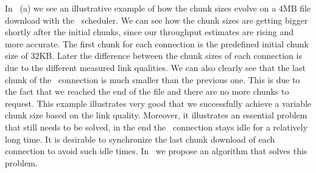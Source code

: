 In~ (a) we see an illustrative example of how the chunk sizes evolve on a $4$MB file download with the \algalpha~scheduler. 
We can see how the chunk sizes are getting bigger shortly after the initial chunks, since our throughput estimates are rising and more accurate. 
The first chunk for each connection is the predefined initial chunk size of $32$KB. 
Later the difference between the chunk sizes of each connection is due to the different measured link qualities. 
We can also clearly see that the last chunk of the \wifi~connection is much smaller than the previous one. 
This is due to the fact that we reached the end of the file and there are no more chunks to request. 
This example illustrates very good that we successfully achieve a variable chunk size based on the link quality. 
Moreover, it illustrates an essential problem that still needs to be solved, \ie in the end the \wifi~connection stays idle for a relatively long time. 
It is desirable to synchronize the last chunk download of each connection to avoid such idle times. 
In~ we propose an algorithm that solves this problem. 
